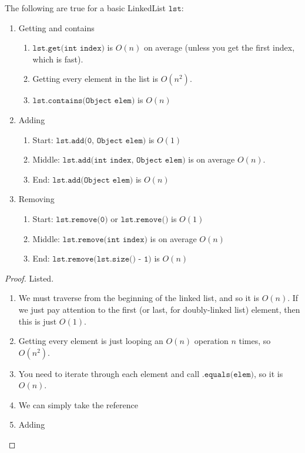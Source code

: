   \begin{theorem}
  The following are true for a basic LinkedList $\texttt{lst}$:  
  \begin{enumerate}
      \item Getting and contains 
      \begin{enumerate}
          \item $\texttt{lst.get(int index)}$ is $O(n)$ on average (unless you get the first index, which is fast).  
          \item Getting every element in the list is $O(n^2)$. 
          \item $\texttt{lst.contains(Object elem)}$ is $O(n)$ 
      \end{enumerate}
      
      \item Adding 
      \begin{enumerate}
          \item Start:  $\texttt{lst.add(0, Object elem)}$ is $O(1)$ 
          \item Middle: $\texttt{lst.add(int index, Object elem)}$ is on average $O(n)$. 
          \item End:    $\texttt{lst.add(Object elem)}$ is $O(n)$
      \end{enumerate}
      
      \item Removing 
      \begin{enumerate}
          \item Start:  $\texttt{lst.remove(0)}$ or $\texttt{lst.remove()}$ is $O(1)$ 
          \item Middle: $\texttt{lst.remove(int index)}$ is on average $O(n)$ 
          \item End:    $\texttt{lst.remove(lst.size() - 1)}$ is $O(n)$ 
      \end{enumerate}
  \end{enumerate}
  \end{theorem}
  \begin{proof}
  Listed. 
  \begin{enumerate}
      \item We must traverse from the beginning of the linked list, and so it is $O(n)$. If we just pay attention to the first (or last, for doubly-linked list) element, then this is just $O(1)$. 
      \item Getting every element is just looping an $O(n)$ operation $n$ times, so $O(n^2)$. 
      \item You need to iterate through each element and call $\texttt{.equals(elem)}$, so it is $O(n)$. 
      \item We can simply take the reference 
      \item Adding 
  \end{enumerate}
  \end{proof}

